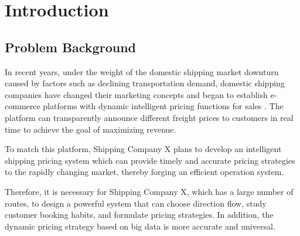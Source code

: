 \section{Introduction}        
\subsection{Problem Background}%
In recent years, under the weight of the domestic shipping market downturn caused by factors such as declining transportation demand, domestic shipping companies have changed their marketing concepts and began to establish e-commerce platforms with dynamic intelligent pricing \parencite{ps} functions for sales \parencite{fp}. The platform can transparently announce different freight prices to customers in real time to achieve the goal of maximizing revenue. 

To match this platform, Shipping Company X plans to develop an intelligent shipping pricing system which can provide timely and accurate pricing strategies to the rapidly changing market, thereby forging an efficient operation system. 

Therefore, it is necessary for Shipping Company X, which has a large number of routes, to design a powerful system that can choose direction flow, study customer booking habits, and formulate pricing strategies. In addition, the dynamic pricing strategy based on big data is more accurate and universal\parencite{dynamic-pricing}.


